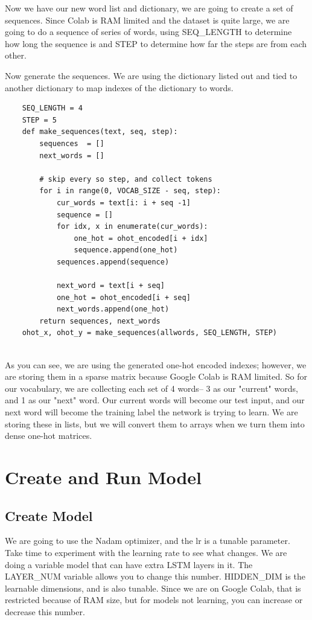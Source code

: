 \documentclass{article}
\begin{document}
 Now we have our new word list and dictionary, we are going to create a set of sequences. Since Colab is RAM limited and the dataset is quite large, we are going to do a sequence of series of words, using SEQ\_LENGTH to determine how long the sequence is and STEP to determine how far the steps are from each other. 
  
  Now generate the sequences. We are using the dictionary listed out and tied to another dictionary to map indexes of the dictionary to words.  
  
  \begin{verbatim}
    SEQ_LENGTH = 4
    STEP = 5
    def make_sequences(text, seq, step):
        sequences  = []
        next_words = []

        # skip every so step, and collect tokens 
        for i in range(0, VOCAB_SIZE - seq, step):
            cur_words = text[i: i + seq -1]
            sequence = []
            for idx, x in enumerate(cur_words):
                one_hot = ohot_encoded[i + idx]
                sequence.append(one_hot)
            sequences.append(sequence)

            next_word = text[i + seq]
            one_hot = ohot_encoded[i + seq]
            next_words.append(one_hot)
        return sequences, next_words
    ohot_x, ohot_y = make_sequences(allwords, SEQ_LENGTH, STEP)
      
  \end{verbatim}
  
As you can see, we are using the generated one-hot encoded indexes; however, we are storing them in a sparse matrix because Google Colab is RAM limited. So for our vocabulary, we are collecting each set of 4 words-- 3 as our "current" words, and 1 as our "next" word. Our current words will become our test input, and our next word will become the training label the network is trying to learn. We are storing these in lists, but we will convert them to arrays when we turn them into dense one-hot matrices. 

\section{Create and Run Model}

\subsection{Create Model}
We are going to use the Nadam optimizer, and the lr is a tunable parameter. Take time to experiment with the learning rate to see what changes. We are doing a variable model that can have extra LSTM layers in it. The LAYER\_NUM variable allows you to change this number. HIDDEN\_DIM is the learnable dimensions, and is also tunable. Since we are on Google Colab, that is restricted because of RAM size, but for models not learning, you can increase or decrease this number.
\end{document}
